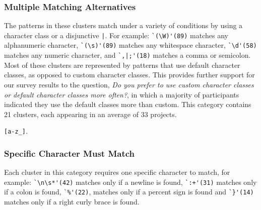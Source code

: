 \subsubsection{Multiple Matching Alternatives}
The patterns in these clusters match under a variety of conditions by using a character class or a disjunctive \verb!|!.
For example:
\verb!`(\W)'(89)! matches any alphanumeric character, \verb!`(\s)'(89)! matches any whitespace character, \verb!`\d'(58)! matches any numeric character, and \verb!`,|;'(18)! matches a comma or semicolon.  Most of these clusters are represented by patterns that use default character classes, as opposed to custom character classes.  This provides further support for our survey results to the question, \emph{Do you prefer to use custom character classes or default character classes more often?}, in which a majority of participants indicated they use the default classes more than custom.
This category contains 21 clusters, each appearing in an average of 33 projects.

\verb![a-z_]!.


\subsubsection{Specific Character Must Match}
\label{cluster:single}
Each cluster in this category requires one specific character to match, for example:
\verb!`\n\s*'(42)! matches only if a newline is found, \verb!`:+'(31)! matches only if a colon is found, \verb!`%'(22)!, matches only if a percent sign is found and \verb!`}'(14)! matches only if a right curly brace is found.



